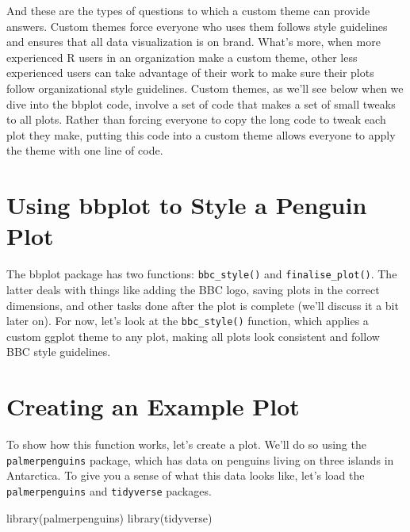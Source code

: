 \documentclass[
]{book}
\newenvironment{Shaded}{\begin{snugshade}}{\end{snugshade}}
\newcommand{\FunctionTok}[1]{\textcolor[rgb]{0.00,0.00,0.00}{#1}}
\newcommand{\NormalTok}[1]{#1}
\begin{document}
And these are the types of questions to which a custom theme can provide answers. Custom themes force everyone who uses them follows style guidelines and ensures that all data visualization is on brand. What's more, when more experienced R users in an organization make a custom theme, other less experienced users can take advantage of their work to make sure their plots follow organizational style guidelines. Custom themes, as we'll see below when we dive into the bbplot code, involve a set of code that makes a set of small tweaks to all plots. Rather than forcing everyone to copy the long code to tweak each plot they make, putting this code into a custom theme allows everyone to apply the theme with one line of code.

\hypertarget{using-bbplot-to-style-a-penguin-plot}{%
\section*{Using bbplot to Style a Penguin Plot}\label{using-bbplot-to-style-a-penguin-plot}}

The bbplot package has two functions: \texttt{bbc\_style()} and \texttt{finalise\_plot()}. The latter deals with things like adding the BBC logo, saving plots in the correct dimensions, and other tasks done after the plot is complete (we'll discuss it a bit later on). For now, let's look at the \texttt{bbc\_style()} function, which applies a custom ggplot theme to any plot, making all plots look consistent and follow BBC style guidelines.

\hypertarget{creating-an-example-plot}{%
\section*{Creating an Example Plot}\label{creating-an-example-plot}}

To show how this function works, let's create a plot. We'll do so using the \texttt{palmerpenguins} package, which has data on penguins living on three islands in Antarctica. To give you a sense of what this data looks like, let's load the \texttt{palmerpenguins} and \texttt{tidyverse} packages.

\begin{Shaded}
\begin{Highlighting}[]
\FunctionTok{library}\NormalTok{(palmerpenguins)}
\FunctionTok{library}\NormalTok{(tidyverse)}
\end{Highlighting}
\end{Shaded}
\end{document}
